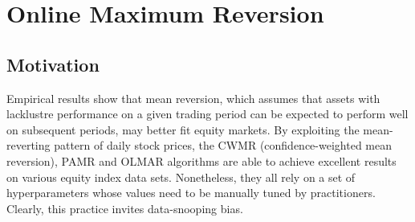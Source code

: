 
\section{Online Maximum Reversion}
\label{sec:olmax}

\subsection{Motivation}
\label{sec:olmax-motivation}

Empirical results \citep{cwmr, pamr, olmar} show that mean reversion, which assumes that assets with lacklustre performance on a given trading period can be expected to perform well on subsequent periods, may better fit equity markets. By exploiting the mean-reverting pattern of daily stock prices, the CWMR (confidence-weighted mean reversion), PAMR and OLMAR algorithms are able to achieve excellent results on various equity index data sets. Nonetheless, they all rely on a set of hyperparameters whose values need to be manually tuned by practitioners. Clearly, this practice invites data-snooping bias.

